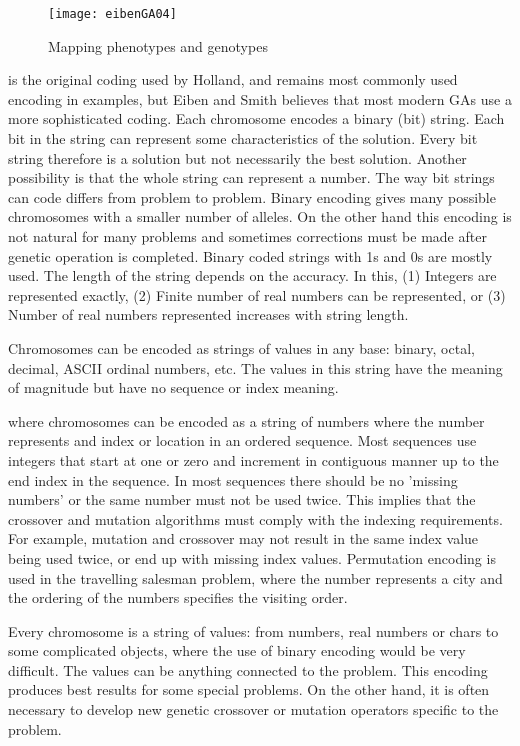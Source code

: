 \begin{figure*}[tph]
\texttt{[image: eibenGA04]}
\caption{Mapping phenotypes and genotypes}
\label{fig:eibenGA04}
\end{figure*}


 is the original coding used by Holland, and remains most commonly used encoding in examples, but Eiben and Smith believes that most modern GAs use a more sophisticated coding. 
Each chromosome encodes a binary (bit) string. Each bit in the string can represent some characteristics of the solution. Every bit string therefore is a solution but not necessarily the best solution. Another possibility is that the whole string can represent a number. The way bit strings can code differs from problem to problem. Binary encoding gives many possible chromosomes with a smaller number of alleles. On the other hand this encoding is not natural for many problems and sometimes
corrections must be made after genetic operation is completed. Binary coded strings with 1s and 0s are mostly used. The length of the string depends on the accuracy.
In this, (1) Integers are represented exactly, (2)  Finite number of real numbers can be represented, or (3)  Number of real numbers represented increases with string length\cite{Sivanandam2007}.

Chromosomes can be encoded as strings of values in any base: binary, octal, decimal, ASCII ordinal numbers, etc.  The values in this string have the meaning of magnitude but have no sequence or index meaning.

 where chromosomes can be encoded as a string of numbers 
where the number represents and index or location in an ordered sequence.  Most sequences use integers that start at one or zero and increment in contiguous manner up to the end index in the sequence. In most sequences there should be no 'missing numbers' or the same number must not be used twice.
This implies that the crossover and mutation algorithms must comply with the indexing requirements.
For example, mutation and crossover may not result in the same index value being used twice, or end up with missing index values.
Permutation encoding is used in the travelling salesman problem, where the number represents a city and the ordering of the numbers specifies the visiting order.

Every chromosome is a string of values: from numbers, real numbers or chars to some complicated objects, where the use of binary encoding would be very difficult.  The values can be anything connected to the problem. This encoding produces best results for some special problems. On the other hand, it is often necessary to develop new genetic crossover or mutation operators specific to the problem. 


